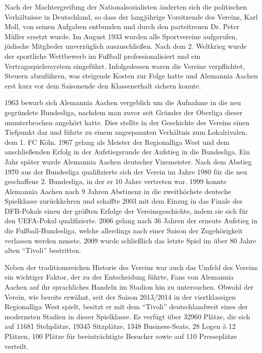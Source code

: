 Nach der Machtergreifung der Nationalsozialisten änderten sich die politischen Verhältnisse in Deutschland, so dass der langjährige Vorsitzende des Vereins, Karl Moll, von seinen Aufgaben entbunden und durch den parteitreuen Dr. Peter Müller ersetzt wurde.
Im August 1933 wurden alle Sportvereine aufgerufen, jüdische Mitglieder unverzüglich auszuschließen.
Nach dem 2. Weltkrieg wurde der sportliche Wettbewerb im Fußball professionalisiert und ein Vertragsspielersystem eingeführt.
Infolgedessen waren die Vereine verpflichtet, Steuern abzuführen, was steigende Kosten zur Folge hatte und Alemannia Aachen erst kurz vor dem Saisonende den Klassenerhalt sichern konnte.

1963 bewarb sich Alemannia Aachen vergeblich um die Aufnahme in die neu gegründete Bundesliga, nachdem man zuvor seit Gründer der Oberliga dieser ununterbrochen angehört hatte.
Dies stellte in der Geschichte des Vereins einen Tiefpunkt dar und führte zu einem angespannten Verhältnis zum Lokalrivalen, dem 1. FC Köln.
1967 gelang als Meister der Regionalliga West und dem anschließenden Erfolg in der Aufstiegsrunde der Aufstieg in die Bundesliga.
Ein Jahr später wurde Alemannia Aachen deutscher Vizemeister.
Nach dem Abstieg 1970 aus der Bundesliga qualifizierte sich der Verein im Jahre 1980 für die neu geschaffene 2. Bundesliga, in der er 10 Jahre vertreten war.
1999 konnte Alemannia Aachen nach 9 Jahren Abstinenz in die zweithöchste deutsche Spielklasse zurückkehren und schaffte 2003 mit dem Einzug in das Finale des DFB-Pokals einen der größten Erfolge der Vereinsgeschichte, indem sie sich für den UEFA-Pokal qualifizierte.
2006 gelang nach 36 Jahren der erneute Aufstieg in die Fußball-Bundesliga, welche allerdings nach einer Saison der Zugehörigkeit verlassen werden musste.
2009 wurde schließlich das letzte Spiel im über 80 Jahre alten "`Tivoli"' bestritten.

Neben der traditionsreichen Historie des Vereins war auch das Umfeld des Vereins ein wichtiger Faktor, der zu der Entscheidung führte, Fans von Alemannia Aachen auf ihr sprachliches Handeln im Stadion hin zu untersuchen.
Obwohl der Verein, wie bereits erwähnt, seit der Saison 2013/2014 in der viertklassigen Regionalliga West spielt, besitzt er mit dem "`Tivoli"' deutschlandweit eines der modernsten Stadien in dieser Spielklasse.
Es verfügt über 32960 Plätze, die sich auf 11681 Stehplätze, 19345 Sitzplätze, 1348 Business-Seats, 28 Logen à 12 Plätzen, 100 Plätze für beeinträchtigte Besucher sowie auf 110 Presseplätze verteilt\cite{AA15}.

